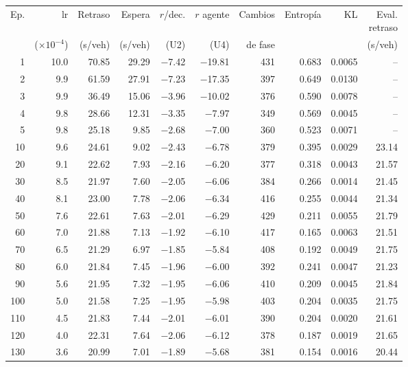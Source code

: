 \begin{table}[H]
\centering
\scriptsize
\setlength{\tabcolsep}{3pt}
\setlength{\tabcolsep}{2pt}
\begin{tabular}{rrrrrrrrrr}
\toprule
Ep. & lr & Retraso & Espera & $r$/dec. & $r$ agente & Cambios & Entropía & KL & \makecell{Eval.\\retraso} \\
 & ($\times 10^{-4}$) & (s/veh) & (s/veh) & (U2) & (U4) & de fase &  &  & (s/veh) \\
\midrule
1 & 10.0 & 70.85 & 29.29 & $-$7.42 & $-$19.81 & 431 & 0.683 & 0.0065 & -- \\
2 & 9.9 & 61.59 & 27.91 & $-$7.23 & $-$17.35 & 397 & 0.649 & 0.0130 & -- \\
3 & 9.9 & 36.49 & 15.06 & $-$3.96 & $-$10.02 & 376 & 0.590 & 0.0078 & -- \\
4 & 9.8 & 28.66 & 12.31 & $-$3.35 & $-$7.97 & 349 & 0.569 & 0.0045 & -- \\
5 & 9.8 & 25.18 & 9.85 & $-$2.68 & $-$7.00 & 360 & 0.523 & 0.0071 & -- \\
10 & 9.6 & 24.61 & 9.02 & $-$2.43 & $-$6.78 & 379 & 0.395 & 0.0029 & 23.14 \\
20 & 9.1 & 22.62 & 7.93 & $-$2.16 & $-$6.20 & 377 & 0.318 & 0.0043 & 21.57 \\
30 & 8.5 & 21.97 & 7.60 & $-$2.05 & $-$6.06 & 384 & 0.266 & 0.0014 & 21.45 \\
40 & 8.1 & 23.00 & 7.78 & $-$2.06 & $-$6.34 & 416 & 0.255 & 0.0044 & 21.34 \\
50 & 7.6 & 22.61 & 7.63 & $-$2.01 & $-$6.29 & 429 & 0.211 & 0.0055 & 21.79 \\
60 & 7.0 & 21.88 & 7.13 & $-$1.92 & $-$6.10 & 417 & 0.165 & 0.0063 & 21.51 \\
70 & 6.5 & 21.29 & 6.97 & $-$1.85 & $-$5.84 & 408 & 0.192 & 0.0049 & 21.75 \\
80 & 6.0 & 21.84 & 7.45 & $-$1.96 & $-$6.00 & 392 & 0.241 & 0.0047 & 21.23 \\
90 & 5.6 & 21.95 & 7.32 & $-$1.95 & $-$6.06 & 410 & 0.209 & 0.0045 & 21.84 \\
100 & 5.0 & 21.58 & 7.25 & $-$1.95 & $-$5.98 & 403 & 0.204 & 0.0035 & 21.75 \\
110 & 4.5 & 21.83 & 7.44 & $-$2.01 & $-$6.01 & 390 & 0.204 & 0.0020 & 21.61 \\
120 & 4.0 & 22.31 & 7.64 & $-$2.06 & $-$6.12 & 378 & 0.187 & 0.0019 & 21.65 \\
130 & 3.6 & 20.99 & 7.01 & $-$1.89 & $-$5.68 & 381 & 0.154 & 0.0016 & 20.44 \\

\end{tabular}
\end{table}
